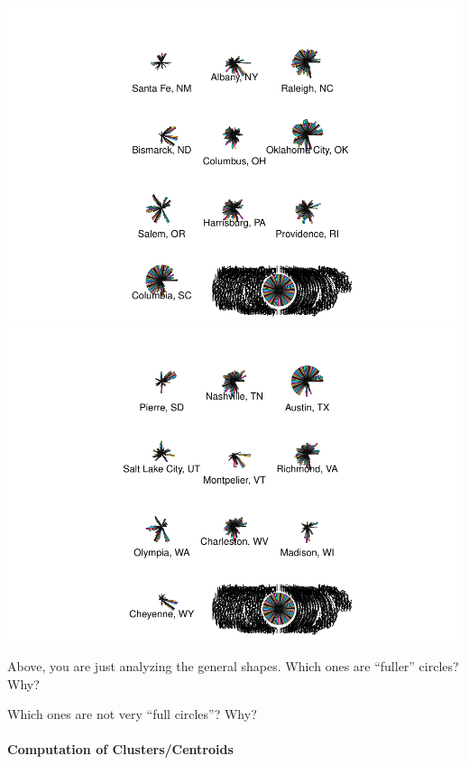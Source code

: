 \documentclass[
]{article}
\begin{document}
\includegraphics{graphics/chunk-distances-kmeans-setup-temp-5.pdf}
\includegraphics{graphics/chunk-distances-kmeans-setup-temp-6.pdf}

Above, you are just analyzing the general shapes. Which ones are
``fuller'' circles? Why?

Which ones are not very ``full circles''? Why?

\hypertarget{computation-of-clusterscentroids}{%
\paragraph{Computation of
Clusters/Centroids}\label{computation-of-clusterscentroids}}
\end{document}
